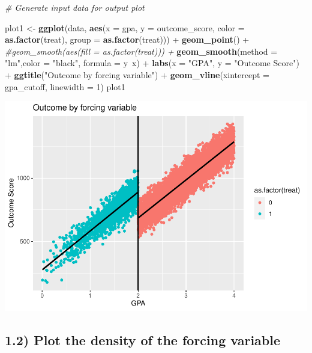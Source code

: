 \documentclass[]{article}
\newenvironment{Shaded}{\begin{snugshade}}{\end{snugshade}}
\newcommand{\KeywordTok}[1]{\textcolor[rgb]{0.13,0.29,0.53}{\textbf{{#1}}}}
\newcommand{\DataTypeTok}[1]{\textcolor[rgb]{0.13,0.29,0.53}{{#1}}}
\newcommand{\DecValTok}[1]{\textcolor[rgb]{0.00,0.00,0.81}{{#1}}}
\newcommand{\StringTok}[1]{\textcolor[rgb]{0.31,0.60,0.02}{{#1}}}
\newcommand{\CommentTok}[1]{\textcolor[rgb]{0.56,0.35,0.01}{\textit{{#1}}}}
\newcommand{\NormalTok}[1]{{#1}}
\begin{document}
\begin{Shaded}
\begin{Highlighting}[]
\CommentTok{# Generate input data for output plot}

\NormalTok{plot1 <-}\StringTok{ }\KeywordTok{ggplot}\NormalTok{(data, }\KeywordTok{aes}\NormalTok{(}\DataTypeTok{x =} \NormalTok{gpa, }\DataTypeTok{y =} \NormalTok{outcome_score, }\DataTypeTok{color =} \KeywordTok{as.factor}\NormalTok{(treat), }\DataTypeTok{group =} \KeywordTok{as.factor}\NormalTok{(treat))) +}\StringTok{ }
\StringTok{  }\KeywordTok{geom_point}\NormalTok{() +}
\StringTok{  }\CommentTok{#geom_smooth(aes(fill = as.factor(treat))) +}
\StringTok{  }\KeywordTok{geom_smooth}\NormalTok{(}\DataTypeTok{method =} \StringTok{"lm"}\NormalTok{,}\DataTypeTok{color =} \StringTok{"black"}\NormalTok{, }\DataTypeTok{formula =} \NormalTok{y~x) +}\StringTok{ }
\StringTok{  }\KeywordTok{labs}\NormalTok{(}\DataTypeTok{x =} \StringTok{"GPA"}\NormalTok{, }\DataTypeTok{y =} \StringTok{"Outcome Score"}\NormalTok{) +}\StringTok{ }\KeywordTok{ggtitle}\NormalTok{(}\StringTok{"Outcome by forcing variable"}\NormalTok{) +}
\StringTok{  }\KeywordTok{geom_vline}\NormalTok{(}\DataTypeTok{xintercept =} \NormalTok{gpa_cutoff, }\DataTypeTok{linewidth =} \DecValTok{1}\NormalTok{)}
\NormalTok{plot1}
\end{Highlighting}
\end{Shaded}

\includegraphics{EM2_PS4_Estrada_files/figure-latex/part1-1.pdf}

\subsection{1.2) Plot the density of the forcing
variable}\label{plot-the-density-of-the-forcing-variable}
\end{document}
